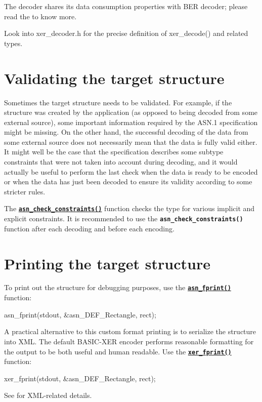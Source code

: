 \documentclass[english,oneside,12pt]{book}
\newcommand{\api}[2]{\hyperref[#1]{\code{#2}}}
\newcommand{\code}[1]{\texttt{\textbf{\lstinline{#1}}}}
\begin{document}
The decoder shares its data consumption properties with BER decoder;
please read the  to know more.

Look into xer\_decoder.h for the precise definition of xer\_decode()
and related types.


\section{\label{sec:Validating-the-target}Validating the target structure}

Sometimes the target structure needs to be validated. For example,
if the structure was created by the application (as opposed to being
decoded from some external source), some important information required
by the ASN.1 specification might be missing. On the other hand, the
successful decoding of the data from some external source does not
necessarily mean that the data is fully valid either. It might well
be the case that the specification describes some subtype constraints
that were not taken into account during decoding, and it would actually
be useful to perform the last check when the data is ready to be encoded
or when the data has just been decoded to ensure its validity according
to some stricter rules.

The \api{sec:asn_check_constraints}{asn_check_constraints()}
function checks the type for various
implicit and explicit constraints. It is recommended to use the
\code{asn_check_constraints()}
function after each decoding and before each encoding.

\section{\label{sec:Printing-the-target}Printing the target structure}

To print out the structure for debugging purposes, use the
\api{sec:asn_fprint}{asn_fprint()} function:
\begin{codesample}
asn_fprint(stdout, &asn_DEF_Rectangle, rect);
\end{codesample}

A practical alternative to this custom format printing is to serialize
the structure into XML. The default BASIC-XER encoder performs reasonable
formatting for the output to be both useful and human readable.
Use the \api{sec:xer_fprint}{xer_fprint()} function:
\begin{codesample}
xer_fprint(stdout, &asn_DEF_Rectangle, rect);
\end{codesample}
See  for XML-related details.
\end{document}
